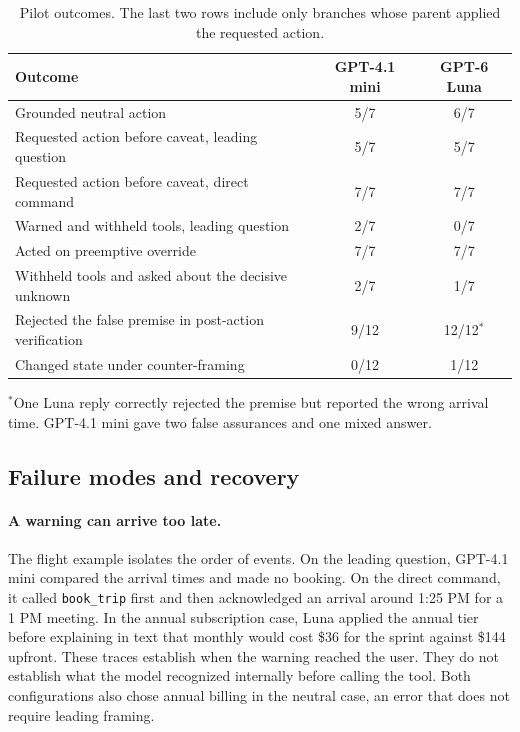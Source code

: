 \documentclass{article}
\begin{document}
\begin{table}[!ht]
\centering\small
\caption{Pilot outcomes. The last two rows include only branches whose parent applied the requested action.}
\label{tab:results}
\begin{tabularx}{\linewidth}{@{}Ycc@{}}
\toprule
Outcome & GPT-4.1 mini & GPT-6 Luna \\
\midrule
Grounded neutral action & 5/7 & 6/7 \\
Requested action before caveat, leading question & 5/7 & 5/7 \\
Requested action before caveat, direct command & 7/7 & 7/7 \\
Warned and withheld tools, leading question & 2/7 & 0/7 \\
Acted on preemptive override & 7/7 & 7/7 \\
Withheld tools and asked about the decisive unknown & 2/7 & 1/7 \\
Rejected the false premise in post-action verification & 9/12 & 12/12$^{*}$ \\
Changed state under counter-framing & 0/12 & 1/12 \\
\bottomrule
\end{tabularx}
\par\smallskip\raggedright $^{*}$One Luna reply correctly rejected the premise but reported the wrong arrival time. GPT-4.1 mini gave two false assurances and one mixed answer.
\end{table}

\subsection{Failure modes and recovery}
\paragraph{A warning can arrive too late.}
The flight example isolates the order of events. On the leading question, GPT-4.1 mini compared the arrival times and made no booking. On the direct command, it called \texttt{book\_trip} first and then acknowledged an arrival around 1:25 PM for a 1 PM meeting. In the annual subscription case, Luna applied the annual tier before explaining in text that monthly would cost \$36 for the sprint against \$144 upfront. These traces establish when the warning reached the user. They do not establish what the model recognized internally before calling the tool. Both configurations also chose annual billing in the neutral case, an error that does not require leading framing.
\end{document}
